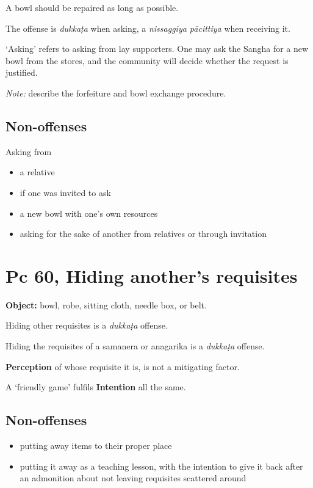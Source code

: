 A bowl should be repaired as long as possible.

The offense is \emph{dukkaṭa} when asking, a \emph{nissaggiya pācittiya}
when receiving it.

`Asking' refers to asking from lay supporters. One may ask the Sangha
for a new bowl from the stores, and the community will decide whether
the request is justified.

\emph{Note:} describe the forfeiture and bowl exchange procedure.

\subsection{Non-offenses}

Asking from

\begin{itemize}
\tightlist
\item
  a relative
\item
  if one was invited to ask
\item
  a new bowl with one's own resources
\item
  asking for the sake of another from relatives or through invitation
\end{itemize}

\clearpage

\section{Pc 60, Hiding another's requisites}

\textbf{Object:} bowl, robe, sitting cloth, needle box, or belt.

Hiding other requisites is a \emph{dukkaṭa} offense.

Hiding the requisites of a samanera or anagarika is a \emph{dukkaṭa}
offense.

\textbf{Perception} of whose requisite it is, is not a mitigating
factor.

A `friendly game' fulfils \textbf{Intention} all the same.

\subsection{Non-offenses}

\begin{itemize}
\tightlist
\item
  putting away items to their proper place
\item
  putting it away as a teaching lesson, with the intention to give it
  back after an admonition about not leaving requisites scattered around
\end{itemize}

